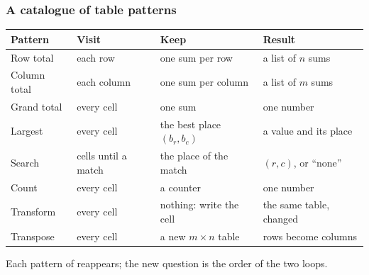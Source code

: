 \documentclass[aspectratio=169,10pt,compress]{beamer}
\begin{document}
\begin{frame}[t,fragile] \frametitle{A catalogue of table patterns}


\begin{table}
		\footnotesize
		\begin{tabular}{@{}L{0.14\textwidth}L{0.24\textwidth}L{0.22\textwidth}L{0.30\textwidth}@{}}
			\toprule
			\textbf{Pattern} & \textbf{Visit} & \textbf{Keep} & \textbf{Result} \\
			\midrule
			Row total     & each row               & one sum per row            & a list of $n$ sums \\
			Column total  & each column            & one sum per column         & a list of $m$ sums \\
			Grand total   & every cell             & one sum                    & one number \\
			Largest       & every cell             & the best place $(b_{r}, b_{c})$ & a value and its place \\
			Search        & cells until a match    & the place of the match     & $(r, c)$, or ``none'' \\
			Count         & every cell             & a counter                  & one number \\
			Transform     & every cell             & nothing: write the cell    & the same table, changed \\
			Transpose     & every cell             & a new $m \times n$ table   & rows become columns \\
			\bottomrule
		\end{tabular}
\end{table}%


	\vspace{0.3em}
	\small Each pattern of  reappears; the new question is the order of the two loops.
\end{frame}
\end{document}

